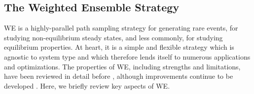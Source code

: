 \begin{comment}
The rules for resampling trajectories without bias are extremely flexible \citep{Zhang2010} and numerous possibilities are implemented within the WESTPA software. 
Typically, WE simulations rely on “bins,” which are defined regions of configuration space for which the user defines a target number of trajectories \citep{huber_weighted-ensemble_1996}. 
In WESTPA, bins can be constructed from simple one or two-dimensional “progress coordinates”, a hierarchical nesting of bins inside of other bins, Voronoi cells, or the WExplore hierarchical Voronoi strategy \citep{Zwier2015,dickson_wexplore_2014}.
Strictly speaking, it is worth noting that bins are not required to perform WE-like resampling \citep{Dickson2018or19}.

Each WE simulation ultimately yields an ensemble of trajectories, from which different types of information can be extracted. 
Each trajectory which makes a full transition between states of interest, say from A to B, yields an ordered set of configurations which can be analyzed for structural changes and for the sequence of events. 
The full weighted ensemble of trajectories, if clustered into pathway groups, can provide information on the relative importance of different pathways \citep{Ernesto2019}. 
If WE was performed with a “recycling” condition where trajectories reaching B are fed back to A, then the rate constant for the process can be estimated from the probability flux arriving to state B if the simulation achieves steady state and hence constant flux \citep{Divesh2010,ZuckermanChong2017}.
If a WE simulation does not achieve steady state, it is still possible in principle to estimate rate constants using a non-Markovian analysis, also called a history-augmented Markov State Model \cite{Ernesto2014,Upendra2019,copperman_accelerated_2020}.
\end{comment}



\subsection{The Weighted Ensemble Strategy}

WE is a highly-parallel path sampling strategy for generating rare events, for studying non-equilibrium steady states, and less commonly, for studying equilibrium properties. 
At heart, it is a simple and flexible strategy which is agnostic to system type and which therefore lends itself to numerous applications and optimizations. 
The properties of WE, including strengths and limitations, have been reviewed in detail before \citep{zuckerman_weighted_2017}, although improvements continue to be developed \citep{donyapour_revo_2019, copperman_accelerated_2020, torrillo_minimal_2021, degrave_red_2021, aristoff_optimizing_2020}. 
Here, we briefly review key aspects of WE.

